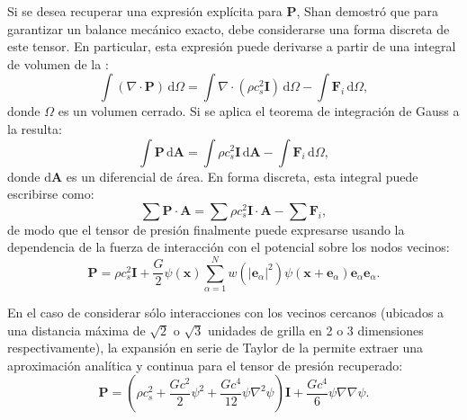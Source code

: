 Si se desea recuperar una expresi\'on expl\'icita para $\bm{P}$, Shan \cite{shan_pressure_2008} demostr\'o que para garantizar un balance mec\'anico exacto, debe considerarse una forma discreta de este tensor. En particular, esta expresi\'on puede derivarse a partir de una integral de volumen de la :
\begin{equation}
	\int (\nabla \cdot \bm{P}) \, \mbox{d}\Omega = \int \nabla \cdot (\rho c_s^2 \bm{I})\, \mbox{d}\Omega - \int \bm{F}_i \, \mbox{d}\Omega,
	\label{eq:integral_pres}
\end{equation}
donde $\Omega$ es un volumen cerrado. Si se aplica el teorema de integraci\'on de Gauss a la  resulta:
\begin{equation}
	\int \bm{P} \, \mbox{d} \bm{A} = \int \rho c_s^2 \bm{I}\, \mbox{d} \bm{A} - \int \bm{F}_i \, \mbox{d}\Omega,
\end{equation}
donde $\mbox{d} \bm{A}$ es un diferencial de \'area. En forma discreta, esta integral puede escribirse como:
\begin{equation}
	\sum \bm{P} \cdot \bm{A} = \sum \rho c_s^2 \bm{I} \cdot \bm{A} - \sum \bm{F}_i,
\end{equation}
de modo que el tensor de presi\'on finalmente puede expresarse usando la dependencia de la fuerza de interacci\'on con el potencial sobre los nodos vecinos:
\begin{equation}
	\bm{P} = \rho c_s^2 \bm{I} + \dfrac{G}{2}\psi(\bm{x}) \sum_{\alpha=1}^N w(|\bm{e}_{\alpha}|^2)\psi(\bm{x}+\bm{e}_{\alpha})\bm{e}_{\alpha}\bm{e}_{\alpha}.
	\label{eq:ptens_shan}
\end{equation}

En el caso de considerar s\'olo interacciones con los vecinos cercanos (ubicados a una distancia m\'axima de $\sqrt{2}$ o $\sqrt{3}$ unidades de grilla en 2 o 3 dimensiones respectivamente), la expansi\'on en serie de Taylor de la  permite extraer una aproximaci\'on anal\'itica y continua para el tensor de presi\'on recuperado:
\begin{equation}
	\bm{P} = \left( \rho c_s^2 + \dfrac{G c^2}{2} \psi^2 + \dfrac{G c^4}{12} \psi \nabla^2 \psi \right) \bm{I} + \dfrac{G c^4}{6} \psi \nabla \nabla \psi.
	\label{eq:ptens_shan_taylor}	
\end{equation}


